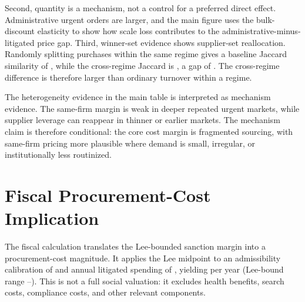 Second, quantity is a mechanism, not a control for a preferred direct
effect. Administrative urgent orders are larger, and the main figure
uses the bulk-discount elasticity to show how scale loss contributes
to the administrative-minus-litigated price gap. Third, winner-set
evidence shows supplier-set reallocation. Randomly splitting purchases
within the same regime gives a baseline Jaccard similarity of
\BPwfChurnBaselineJaccard{}, while the cross-regime Jaccard is
\BPwinnerSwitchJaccardMean{}, a gap of \BPwfChurnGap{}. The
cross-regime difference is therefore larger than ordinary turnover
within a regime.

The heterogeneity evidence in the main table is interpreted as
mechanism evidence. The same-firm margin is weak in deeper repeated
urgent markets, while supplier leverage can reappear in thinner or
earlier markets. The mechanism claim is therefore conditional: the
core cost margin is fragmented sourcing, with same-firm pricing more
plausible where demand is small, irregular, or institutionally less
routinized.

\section{Fiscal Procurement-Cost Implication}
\label{app:cost}

The fiscal calculation translates the Lee-bounded sanction margin into
a procurement-cost magnitude. It applies the Lee midpoint
\BPprocCostBoundUTGmidPct{} to an admissibility calibration of
\BPprocCostBoundAdmissibility{} and annual litigated spending of
\BPprocCostBoundAnnualSpend{}, yielding \BPprocCostBound{} per year
(Lee-bound range \BPprocCostBoundCIlow{}--\BPprocCostBoundCIhigh{}).
This is not a full social valuation: it excludes health benefits,
search costs, compliance costs, and other relevant components.


